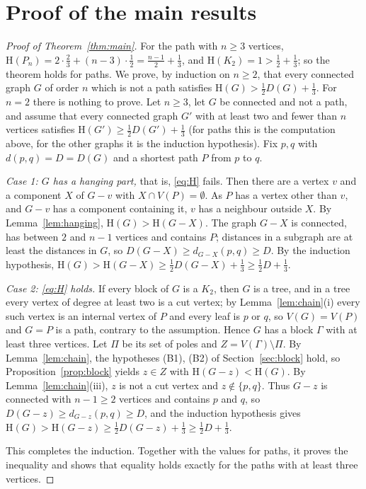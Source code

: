 \documentclass[11pt]{article}
\theoremstyle{definition}
\theoremstyle{remark}
\newcommand{\Hm}{\mathrm{H}}
\newcommand{\D}{D}
\begin{document}
\section{Proof of the main results}\label{sec:proof}

\begin{proof}[Proof of Theorem~\ref{thm:main}]
For the path with $n\ge3$ vertices, $\Hm(P_n)=2\cdot\frac23+(n-3)\cdot\frac12=\frac{n-1}2+\frac13$,
and $\Hm(K_2)=1>\frac12+\frac13$; so the theorem holds for paths. We prove, by induction on
$n\ge2$, that every connected graph $G$ of order $n$ which is not a path satisfies
$\Hm(G)>\frac12\D(G)+\frac13$. For $n=2$ there is nothing to prove. Let $n\ge3$, let $G$ be
connected and not a path, and assume that every connected graph $G'$ with at least two and
fewer than $n$ vertices satisfies $\Hm(G')\ge\frac12\D(G')+\frac13$ (for paths this is the
computation above, for the other graphs it is the induction hypothesis). Fix $p,q$ with
$d(p,q)=\D=\D(G)$ and a shortest path $P$ from $p$ to $q$.

\emph{Case 1: $G$ has a hanging part,} that is, \eqref{eq:H} fails. Then there are a vertex $v$
and a component $X$ of $G-v$ with $X\cap V(P)=\emptyset$. As $P$ has a vertex other than $v$,
and $G-v$ has a component containing it, $v$ has a neighbour outside $X$. By
Lemma~\ref{lem:hanging}, $\Hm(G)>\Hm(G-X)$. The graph $G-X$ is connected, has between $2$ and
$n-1$ vertices and contains $P$; distances in a subgraph are at least the distances in $G$, so
$\D(G-X)\ge d_{G-X}(p,q)\ge\D$. By the induction hypothesis,
$\Hm(G)>\Hm(G-X)\ge\frac12\D(G-X)+\frac13\ge\frac12\D+\frac13$.

\emph{Case 2: \eqref{eq:H} holds.} If every block of $G$ is a $K_2$, then $G$ is a tree, and
in a tree every vertex of degree at least two is a cut vertex; by Lemma~\ref{lem:chain}(i)
every such vertex is an internal vertex of $P$ and every leaf is $p$ or $q$, so $V(G)=V(P)$
and $G=P$ is a path, contrary to the assumption.
Hence $G$ has a block $\Gamma$ with at least three vertices. Let $\Pi$ be its set of poles and
$Z=V(\Gamma)\setminus\Pi$. By Lemma~\ref{lem:chain}, the hypotheses (B1), (B2) of
Section~\ref{sec:block} hold, so Proposition~\ref{prop:block} yields $z\in Z$ with
$\Hm(G-z)<\Hm(G)$. By Lemma~\ref{lem:chain}(iii), $z$ is not a cut vertex and
$z\notin\{p,q\}$. Thus $G-z$ is connected with $n-1\ge2$ vertices and contains $p$ and $q$,
so $\D(G-z)\ge d_{G-z}(p,q)\ge\D$, and the induction hypothesis gives
$\Hm(G)>\Hm(G-z)\ge\frac12\D(G-z)+\frac13\ge\frac12\D+\frac13$.

This completes the induction. Together with the values for paths, it proves the inequality
and shows that equality holds exactly for the paths with at least three vertices.
\end{proof}
\end{document}
